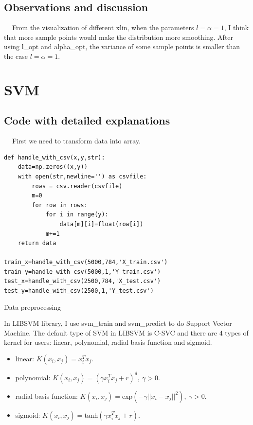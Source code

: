 \documentclass{article}
\begin{document}
\subsection{Observations and discussion}

$\quad\ $From the visualization of different xlin, when the parameters $l=\alpha=1$, I think that more sample points would make the distribution more smoothing. After using l\_opt and alpha\_opt, the variance of some sample points is smaller than the case $l=\alpha=1$.

\newpage

\section{SVM}

\subsection{Code with detailed explanations}

$\quad\ $First we need to transform data into array.
\begin{listing}[!ht]
\begin{verbatim}
def handle_with_csv(x,y,str):
    data=np.zeros((x,y))
    with open(str,newline='') as csvfile:
        rows = csv.reader(csvfile)
        m=0
        for row in rows:
            for i in range(y):
                data[m][i]=float(row[i])
            m+=1
    return data
    
train_x=handle_with_csv(5000,784,'X_train.csv')
train_y=handle_with_csv(5000,1,'Y_train.csv')
test_x=handle_with_csv(2500,784,'X_test.csv')
test_y=handle_with_csv(2500,1,'Y_test.csv')
\end{verbatim}
\caption{Data preprocessing}
\label{listing}
\end{listing}

In LIBSVM library, I use svm\_train and svm\_predict to do Support Vector Machine. The default type of SVM in LIBSVM is C-SVC and there are 4 types of kernel for users: linear, polynomial, radial basis function and sigmoid.
\begin{itemize}
\item linear: $K(x_i,x_j)=x_i^Tx_j$.
\item polynomial: $K(x_i,x_j)={(\gamma x_i^Tx_j +r)}^d,\ \gamma > 0$.
\item radial basis function: $K(x_i,x_j)=\mbox{exp}(-\gamma {||x_i-x_j||}^2),\ \gamma > 0$.
\item sigmoid: $K(x_i,x_j)=\mbox{tanh}(\gamma x_i^Tx_j +r)$.
\end{itemize}
\end{document}
